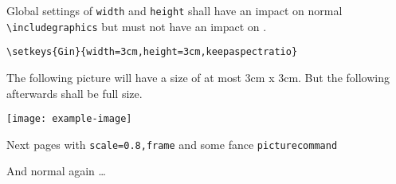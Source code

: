 \documentclass[a4paper,\myClassOptions]{article}
\begin{document}
\Large

Global settings of \verb|width| and \verb|height| shall have an
impact on normal \verb|\includegraphics| but must not have an impact
on \verb||.

\verb|\setkeys{Gin}{width=3cm,height=3cm,keepaspectratio}|

The following picture will have a size of at most 3cm x 3cm.
But the \verb|| following afterwards shall be full size.
\vspace*{\bigskipamount}



\texttt{[image: example-image]}




Next pages with \verb|scale=0.8,frame| and some fance \verb|picturecommand|



And normal again \ldots
{}

\end{document}
